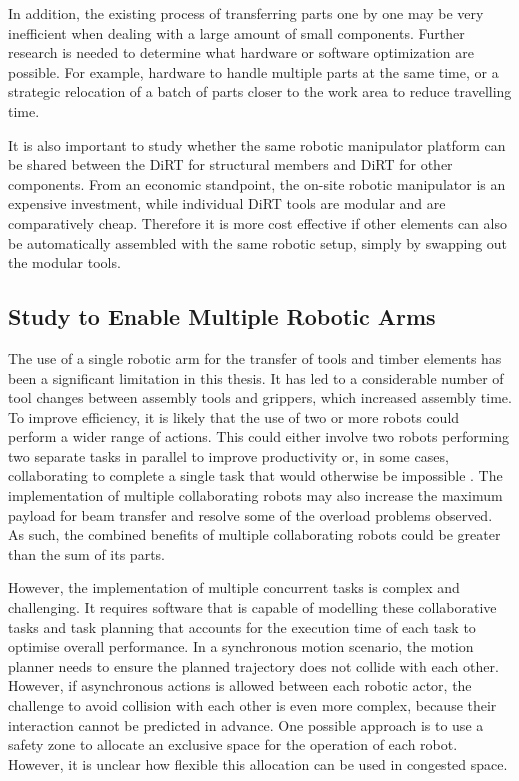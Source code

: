 In addition, the existing process of transferring parts one by one may be very inefficient when dealing with a large amount of small components. Further research is needed to determine what hardware or software optimization are possible. For example, hardware to handle multiple parts at the same time, or a strategic relocation of a batch of parts closer to the work area to reduce travelling time. 

It is also important to study whether the same robotic manipulator platform can be shared between the DiRT for structural members and DiRT for other components. From an economic standpoint, the on-site robotic manipulator is an expensive investment, while individual DiRT tools are modular and are comparatively cheap. Therefore it is more cost effective if other elements can also be automatically assembled with the same robotic setup, simply by swapping out the modular tools.

\subsection{Study to Enable Multiple Robotic Arms}
\label{subsection:study_to_enable_multiple_robots
}
The use of a single robotic arm for the transfer of tools and timber elements has been a significant limitation in this thesis. It has led to a considerable number of tool changes between assembly tools and grippers, which increased assembly time. To improve efficiency, it is likely that the use of two or more robots could perform a wider range of actions. This could either involve two robots performing two separate tasks in parallel to improve productivity or, in some cases, collaborating to complete a single task that would otherwise be impossible . The implementation of multiple collaborating robots may also increase the maximum payload for beam transfer and resolve some of the overload problems observed. As such, the combined benefits of multiple collaborating robots could be greater than the sum of its parts.

However, the implementation of multiple concurrent tasks is complex and challenging. It requires software that is capable of modelling these collaborative tasks and task planning that accounts for the execution time of each task to optimise overall performance. In a synchronous motion scenario, the motion planner needs to ensure the planned trajectory does not collide with each other. However, if asynchronous actions is allowed between each robotic actor, the challenge to avoid collision with each other is even more complex, because their interaction cannot be predicted in advance. One possible approach is to use a safety zone to allocate an exclusive space for the operation of each robot. However, it is unclear how flexible this allocation can be used in congested space.


